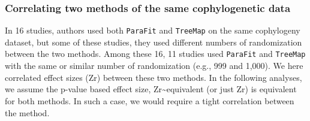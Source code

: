 \documentclass[
]{article}
\begin{document}
\hypertarget{correlating-two-methods-of-the-same-cophylogenetic-data}{%
\subsubsection{Correlating two methods of the same cophylogenetic
data}\label{correlating-two-methods-of-the-same-cophylogenetic-data}}

In 16 studies, authors used both \texttt{ParaFit} and \texttt{TreeMap}
on the same cophylogeny dataset, but some of these studies, they used
different numbers of randomization between the two methods. Among these
16, 11 studies used \texttt{ParaFit} and \texttt{TreeMap} with the same
or similar number of randomization (e.g., 999 and 1,000). We here
correlated effect sizes (Zr) between these two methods. In the following
analyses, we assume the p-value based effect size,
Zr\textasciitilde equivalent (or just Zr) is equivalent for both
methods. In such a case, we would require a tight correlation between
the method.
\end{document}

